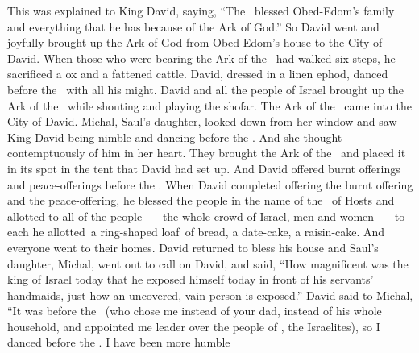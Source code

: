 \begin{inparaenum}
   This was explained to King David, saying, ``The \lord\ blessed Obed-Edom's family and everything that he has because of the Ark of God.'' So David went and joyfully brought up the Ark of God from Obed-Edom's house to the City of David.%
   When those who were bearing the Ark of the \lord\ had walked six steps, he sacrificed a ox and a fattened cattle.%
   David, dressed in a linen ephod, danced before the \lord\ with all his might.%
   David and all the people of Israel brought up the Ark of the \lord\ while shouting and playing the shofar.%
   The Ark of the \lord\ came into the City of David. Michal, Saul's daughter, looked down from her window and saw King David being nimble and dancing before the \lord. And she thought contemptuously of him in her heart.%
   They brought the Ark of the \lord\ and placed it in its spot in the tent that David had set up. And David offered burnt offerings and peace-offerings before the \lord.%
   When David completed offering the burnt offering and the peace-offering, he blessed the people in the name of the \lord\ of Hosts%
   and allotted to all of the people~--- the whole crowd of Israel, men and women~--- to each he allotted\understood{}\ a ring-shaped loaf\understood{}\ of bread, a date-cake, a raisin-cake. And everyone went to their homes.%
   David returned to bless his house and Saul's daughter, Michal, went out to call on David, and said, ``How magnificent was the king of Israel today that he exposed himself today in front of his servants' handmaids, just how an uncovered, vain person is exposed.''%
   David said to Michal, ``It was before the \lord\ (who chose me instead of your dad, instead of his whole household, and appointed me leader over the people of \god, the Israelites), so I danced before the \lord.%
   I have been more humble
\end{inparaenum}
